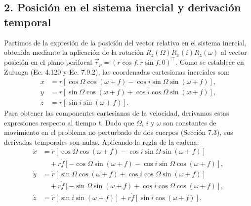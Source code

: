\documentclass[12pt, a4paper]{article}
\begin{document}
\subsection*{2. Posición en el sistema inercial y derivación temporal}
Partimos de la expresión de la posición del vector relativo en el sistema inercial, obtenida mediante la aplicación de la rotación $R_z(\Omega)R_x(i)R_z(\omega)$ al vector posición en el plano perifocal $\vec{r}_p = (r\cos f, r\sin f, 0)^\top$. Como se establece en Zuluaga (Ec. 4.120 y Ec. 7.9.2), las coordenadas cartesianas inerciales son:
\begin{align*}
x &= r\left[ \cos\Omega \cos(\omega+f) - \cos i \sin\Omega \sin(\omega+f) \right], \\
y &= r\left[ \sin\Omega \cos(\omega+f) + \cos i \cos\Omega \sin(\omega+f) \right], \\
z &= r\left[ \sin i \sin(\omega+f) \right].
\end{align*}
Para obtener las componentes cartesianas de la velocidad, derivamos estas expresiones respecto al tiempo $t$. Dado que $\Omega$, $i$ y $\omega$ son constantes de movimiento en el problema no perturbado de dos cuerpos (Sección 7.3), sus derivadas temporales son nulas. Aplicando la regla de la cadena:
\begin{align*}
\dot{x} &= \dot{r}\left[ \cos\Omega \cos(\omega+f) - \cos i \sin\Omega \sin(\omega+f) \right] \\
&\quad + r\dot{f}\left[ -\cos\Omega \sin(\omega+f) - \cos i \sin\Omega \cos(\omega+f) \right], \\
\dot{y} &= \dot{r}\left[ \sin\Omega \cos(\omega+f) + \cos i \cos\Omega \sin(\omega+f) \right] \\
&\quad + r\dot{f}\left[ -\sin\Omega \sin(\omega+f) + \cos i \cos\Omega \cos(\omega+f) \right], \\
\dot{z} &= \dot{r}\left[ \sin i \sin(\omega+f) \right] + r\dot{f}\left[ \sin i \cos(\omega+f) \right].
\end{align*}
\end{document}
